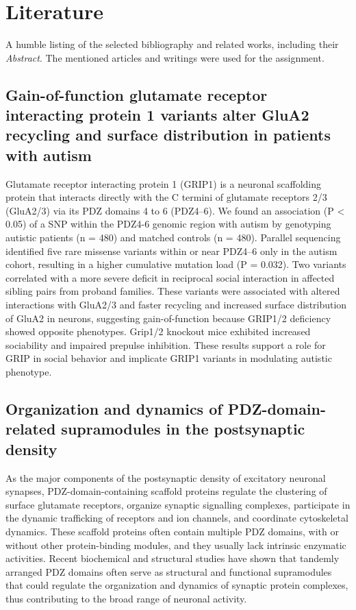 \chapter*{Literature}

A humble listing of the selected bibliography and related works, including their \emph{Abstract}. The mentioned articles and writings were used for 
the assignment.

\section{\cite{mejias2011gain} Gain-of-function glutamate receptor interacting protein 1 variants alter GluA2 recycling and surface distribution in patients with autism } Glutamate receptor interacting protein 1 (GRIP1) is a neuronal scaffolding protein that interacts directly with the C termini of glutamate receptors 2/3 (GluA2/3) via its PDZ domains 4 to 6 (PDZ4–6). We found an association (P < 0.05) of a SNP within the PDZ4-6 genomic region with autism by genotyping autistic patients (n = 480) and matched controls (n = 480). Parallel sequencing identified five rare missense variants within or near PDZ4–6 only in the autism cohort, resulting in a higher cumulative mutation load (P = 0.032). Two variants correlated with a more severe deficit in reciprocal social interaction in affected sibling pairs from proband families. These variants were associated with altered interactions with GluA2/3 and faster recycling and increased surface distribution of GluA2 in neurons, suggesting gain-of-function because GRIP1/2 deficiency showed opposite phenotypes. Grip1/2 knockout mice exhibited increased sociability and impaired prepulse inhibition. These results support a role for GRIP in social behavior and implicate GRIP1 variants in modulating autistic phenotype.

\section{\cite{feng2009organization} Organization and dynamics of PDZ-domain-related supramodules in the postsynaptic density}
As the major components of the postsynaptic density of excitatory neuronal synapses, PDZ-domain-containing scaffold proteins regulate the clustering of surface glutamate receptors, organize synaptic signalling complexes, participate in the dynamic trafficking of receptors and ion channels, and coordinate cytoskeletal dynamics. These scaffold proteins often contain multiple PDZ domains, with or without other protein-binding modules, and they usually lack intrinsic enzymatic activities. Recent biochemical and structural studies have shown that tandemly arranged PDZ domains often serve as structural and functional supramodules that could regulate the organization and dynamics of synaptic protein complexes, thus contributing to the broad range of neuronal activity.

